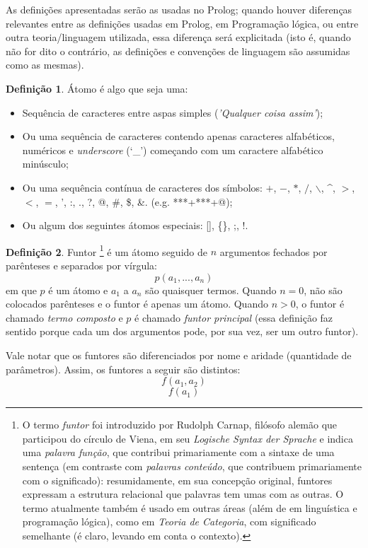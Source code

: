 \documentclass{article}
\theoremstyle{definition}
\newtheorem{definition}{Definição}[section]
\theoremstyle{remark}
\begin{document}
As definições apresentadas serão as usadas no Prolog; quando houver diferenças relevantes entre as definições usadas em Prolog, em Programação lógica, ou entre outra teoria/linguagem utilizada, essa diferença será explicitada (isto é, quando não for dito o contrário, as definições e convenções de linguagem são assumidas como as mesmas).


  \theoremstyle{definition}
  \begin{definition}{Átomo}
  é algo que seja uma:
    \begin{itemize}
      \item Sequência de caracteres entre aspas simples (\textit{'Qualquer coisa assim'});
      \item Ou uma sequência de caracteres contendo apenas caracteres alfabéticos, numéricos e \textit{underscore} (`\_') começando com um caractere alfabético minúsculo;
      \item Ou uma sequência contínua de caracteres dos símbolos: $+$, $-$, $*$, $/$, $\backslash$, \^{}, $>$, $<$, $=$, ', :, ., ?, @, \#, \$, \&. (e.g. ***+***+@);
      \item Ou algum dos seguintes átomos especiais: [], \{\}, ;, !.
    \end{itemize}
  \end{definition}


  \theoremstyle{definition}
  \begin{definition}{Funtor}
    \footnote{ O termo \textit{funtor} foi introduzido por Rudolph Carnap, filósofo alemão que participou do círculo de Viena, em seu \textit{Logische Syntax der Sprache} e indica uma \textit{palavra função}, que contribui primariamente com a sintaxe de uma sentença (em contraste com \textit{palavras conteúdo}, que contribuem primariamente com o significado): resumidamente, em sua concepção original, funtores expressam a estrutura relacional que palavras tem umas com as outras. O termo atualmente também é usado em outras áreas (além de em linguística e programação lógica), como em \textit{Teoria de Categoria}, com   significado semelhante (é claro, levando em conta o contexto).  }
    é um átomo seguido de $n$ argumentos fechados por parênteses e separados por vírgula:
    \[
      p(a_1, ..., a_n)
    \]
\noindent em que $p$ é um átomo e $a_1$ a $a_n$ são quaisquer termos. Quando $n = 0$, não são colocados parênteses e o funtor é apenas um átomo. Quando $n > 0$, o funtor é chamado \textit{termo composto} e $p$ é chamado \textit{funtor principal} (essa definição faz sentido porque cada um dos argumentos pode, por sua vez, ser um outro funtor).
  \end{definition}
Vale notar que os funtores são diferenciados por nome e aridade (quantidade de parâmetros). Assim, os funtores a seguir são distintos:
    \[
      f(a_1, a_2)
    \]
    \[
      f(a_1)
    \]
\end{document}

